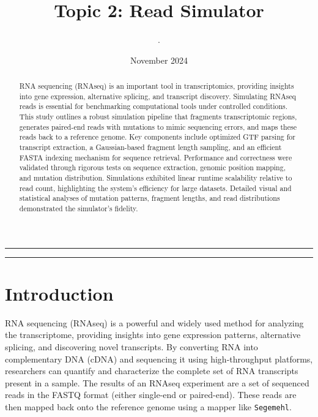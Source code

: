 \documentclass{article}
\title{Topic 2: Read Simulator}
\author{.}
\date{November 2024}
\begin{document}
    \maketitle
    \hrule
    \tableofcontents
    \vspace{10pt} %
    \hrule
    \renewcommand{\abstractname}{}

    \begin{abstract}
        \large
        RNA sequencing (RNAseq) is an important tool in transcriptomics, providing insights into gene expression, alternative splicing, and transcript discovery. Simulating RNAseq reads is essential for benchmarking computational tools under controlled conditions. This study outlines a robust simulation pipeline that fragments transcriptomic regions, generates paired-end reads with mutations to mimic sequencing errors, and maps these reads back to a reference genome. Key components include optimized GTF parsing for transcript extraction, a Gaussian-based fragment length sampling, and an efficient FASTA indexing mechanism for sequence retrieval. Performance and correctness were validated through rigorous tests on sequence extraction, genomic position mapping, and mutation distribution. Simulations exhibited linear runtime scalability relative to read count, highlighting the system’s efficiency for large datasets. Detailed visual and statistical analyses of mutation patterns, fragment lengths, and read distributions demonstrated the simulator’s fidelity.
    \end{abstract}


    \pagebreak


    \section{Introduction}
    \maketitle
    RNA sequencing (RNAseq) is a powerful and widely used method for analyzing the transcriptome, providing insights into gene expression patterns, alternative splicing, and discovering novel transcripts. By converting RNA into complementary DNA (cDNA) and sequencing it using high-throughput platforms, researchers can quantify and characterize the complete set of RNA transcripts present in a sample. The results of an RNAseq experiment are a set of sequenced reads in the FASTQ format (either single-end or paired-end). These reads are then mapped back onto the reference genome using a mapper like \texttt{Segemehl}.
\end{document}
